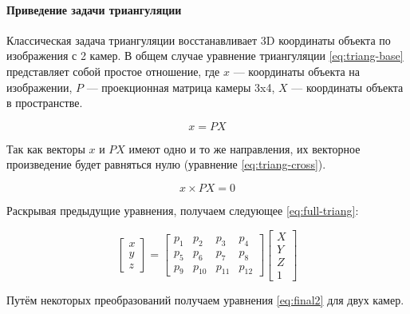\documentclass[specification,annotation,times]{itmo-student-thesis}
\begin{document}
\paragraph{Приведение задачи триангуляции}
Классическая задача триангуляции \cite{845377} восстанавливает 3D координаты \cite{inproceedings} объекта по изображения с 2 камер. В общем случае уравнение триангуляции \ref{eq:triang-base} представляет собой простое отношение, где $ x $ --- координаты объекта на изображении, $ P $ --- проекционная матрица камеры 3x4, $ X $ --- координаты объекта в пространстве.

\begin{equation}
\mathit{ x=PX }
\label{eq:triang-base}
\end{equation}

Так как векторы $ x $ и $ PX $ имеют одно и то же направления, их векторное произведение будет равняться нулю (уравнение \ref{eq:triang-cross}).

\begin{equation}
\mathit{ x \times PX=0 }
\label{eq:triang-cross}
\end{equation}

Раскрывая предыдущие уравнения, получаем следующее \ref{eq:full-triang}:

\begin{equation}
\mathit{
    \begin{bmatrix}
       x \\
       y \\
       z
     \end{bmatrix} =
     \begin{bmatrix}
         p_1 & p_2 & p_3 & p_4 \\
         p_5 & p_6 & p_7 & p_8 \\
         p_9 & p_{10} & p_{11} & p_{12}
     \end{bmatrix}
     \begin{bmatrix}
         X \\
         Y \\
         Z \\
         1
     \end{bmatrix}
}
\label{eq:full-triang}
\end{equation}

Путём некоторых преобразований получаем уравнения \ref{eq:final2} для двух камер.
\end{document}
